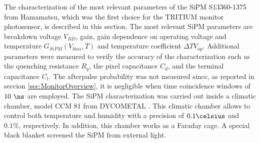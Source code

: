 The characterization of the most relevant parameters of the SiPM S13360-1375 from Hamamatsu, which was the first choice for the TRITIUM monitor photosensor, is described in this section. The most relevant SiPM parameters are breakdown voltage $V_{BD}$, gain, gain dependence on operating voltage and temperature $G_{SiPM}(V_{bias}, T)$ and temperature coefficient $\Delta T V_{op}$. Additional parameters were measured to verify the accuracy of the characterization such as the quenching resistance $R_q$, the pixel capacitance $C_d$, and the terminal capacitance $C_t$. The afterpulse probability was not measured since, as reported in seccion \ref{sec:MonitorOverview}, it is negligible when time coincidence windows of $10~\ns$ are employed. The SiPM characterization was carried out inside a climatic chamber, model CCM 81 from DYCOMETAL \cite{ClimaticChamberIFIMED}. This climatic chamber allows to control both temperature and humidity with a precision of $0.1\celsius$ and $0.1\%$, respectively. In addition, this chamber works as a Faraday cage. A special black blanket \cite{BlackBlancket} screened the SiPM from external light. 

